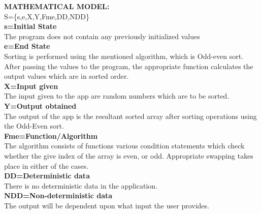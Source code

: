 \documentclass[a4paper,12pt]{article}
\begin{document}
\begin{itemize}
\bigskip
\bigskip

\end{itemize}

\bigskip
\bigskip
\noindent \textbf{MATHEMATICAL MODEL:}\\[0.5cm]
S=\{s,e,X,Y,Fme,DD,NDD\}\\[0.5cm]

\textbf{s=Initial State}\\
The program does not contain any previously initialized values
\\[0.5cm]
\textbf{e=End State}\\

Sorting is performed using the mentioned algorithm, which is Odd-even sort. After passing the values to the program, the appropriate function calculates the output values which are in sorted order.
\\

\textbf{X=Input given}\\
The input given to the app are random numbers which are to be sorted.
\\

\textbf{Y=Output obtained}\\
  The output of the app is the resultant sorted array after sorting operations using the Odd-Even sort.
 \\

\textbf{Fme=Function/Algorithm}\\
The algorithm consists of functions various condition statements which check whether the give index of the array is even, or odd. Appropriate swapping takes place in either of the cases. 
\\

\textbf{DD=Deterministic data}\\
There is no deterministic data in the application.
\\

\textbf{NDD=Non-deterministic data}\\
The output will be dependent upon what input the user provides. 
\\
\end{document}
